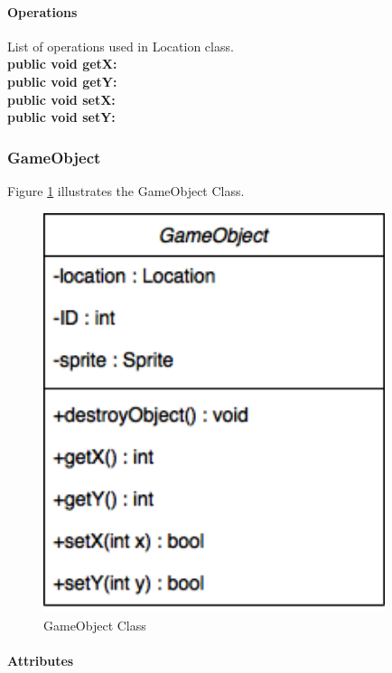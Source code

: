 \documentclass[12pt]{article} %
\begin{document}
\paragraph{Operations \\}
List of operations used in Location class.\\
\textbf{public void getX:}  \\
\textbf{public void getY:}  \\
\textbf{public void setX:}  \\
\textbf{public void setY:}  




\subsubsection{GameObject} %

Figure \ref{fig:gameobject} illustrates the GameObject Class.
\begin{figure}[h!]
   \centering
   \vspace{10pt}%
   \includegraphics[width=10cm]{gameobject.png}
   \caption{GameObject Class}
   \label{fig:gameobject}
\end{figure}

\paragraph{Attributes\\}
\end{document}
